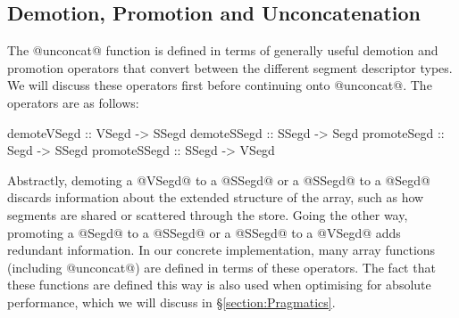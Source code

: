 \subsection{Demotion, Promotion and Unconcatenation}
\label{section:PromotionDemotion}
The @unconcat@ function is defined in terms of generally useful demotion and promotion operators that convert between the different segment descriptor types. We will discuss these operators first before continuing onto @unconcat@. The operators are as follows:
\par
\begin{small}
\begin{code}
  demoteVSegd  :: VSegd -> SSegd
  demoteSSegd  :: SSegd -> Segd
  promoteSegd  :: Segd  -> SSegd
  promoteSSegd :: SSegd -> VSegd
\end{code}
\end{small}
%
Abstractly, demoting a @VSegd@ to a @SSegd@ or a @SSegd@ to a @Segd@ discards information about the extended structure of the array, such as how segments are shared or scattered through the store. Going the other way, promoting a @Segd@ to a @SSegd@ or a @SSegd@ to a @VSegd@ adds redundant information. In our concrete implementation, many array functions (including @unconcat@) are defined in terms of these operators. The fact that these functions are defined this way is also used when optimising for absolute performance, which we will discuss in \S\ref{section:Pragmatics}.


